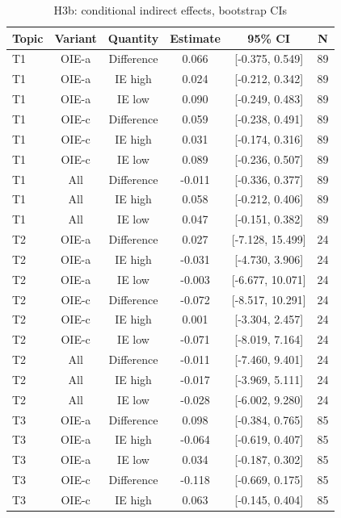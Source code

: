 \begin{table}[htbp]
\centering
\begin{threeparttable}
\caption{H3b: conditional indirect effects, bootstrap CIs}
\label{tab:tab_h3b_indirect_effects}
\begin{tabular}{lccccc}
\toprule
  Topic & Variant & Quantity & Estimate & 95\% CI & N \\
\midrule
  T1 & OIE-a & Difference & 0.066 & [-0.375, 0.549] & 89 \\
  T1 & OIE-a & IE high & 0.024 & [-0.212, 0.342] & 89 \\
  T1 & OIE-a & IE low & 0.090 & [-0.249, 0.483] & 89 \\
  T1 & OIE-c & Difference & 0.059 & [-0.238, 0.491] & 89 \\
  T1 & OIE-c & IE high & 0.031 & [-0.174, 0.316] & 89 \\
  T1 & OIE-c & IE low & 0.089 & [-0.236, 0.507] & 89 \\
  T1 & All & Difference & -0.011 & [-0.336, 0.377] & 89 \\
  T1 & All & IE high & 0.058 & [-0.212, 0.406] & 89 \\
  T1 & All & IE low & 0.047 & [-0.151, 0.382] & 89 \\
  T2 & OIE-a & Difference & 0.027 & [-7.128, 15.499] & 24 \\
  T2 & OIE-a & IE high & -0.031 & [-4.730, 3.906] & 24 \\
  T2 & OIE-a & IE low & -0.003 & [-6.677, 10.071] & 24 \\
  T2 & OIE-c & Difference & -0.072 & [-8.517, 10.291] & 24 \\
  T2 & OIE-c & IE high & 0.001 & [-3.304, 2.457] & 24 \\
  T2 & OIE-c & IE low & -0.071 & [-8.019, 7.164] & 24 \\
  T2 & All & Difference & -0.011 & [-7.460, 9.401] & 24 \\
  T2 & All & IE high & -0.017 & [-3.969, 5.111] & 24 \\
  T2 & All & IE low & -0.028 & [-6.002, 9.280] & 24 \\
  T3 & OIE-a & Difference & 0.098 & [-0.384, 0.765] & 85 \\
  T3 & OIE-a & IE high & -0.064 & [-0.619, 0.407] & 85 \\
  T3 & OIE-a & IE low & 0.034 & [-0.187, 0.302] & 85 \\
  T3 & OIE-c & Difference & -0.118 & [-0.669, 0.175] & 85 \\
  T3 & OIE-c & IE high & 0.063 & [-0.145, 0.404] & 85 \\

\end{tabular}
\end{threeparttable}
\end{table}
